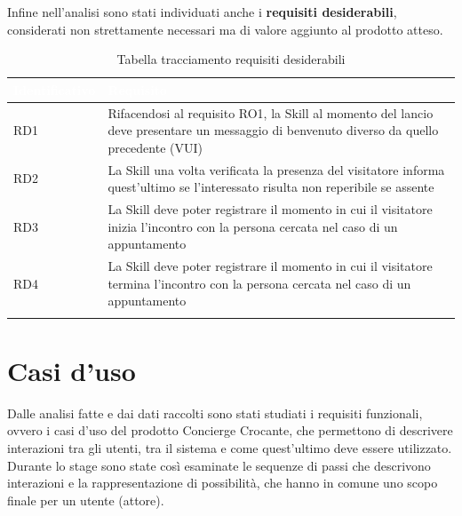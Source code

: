 \noindent Infine nell'analisi sono stati individuati anche i \textbf{requisiti desiderabili}, considerati non strettamente necessari ma di valore aggiunto al prodotto atteso.
\begin{center}
	\centering
	\renewcommand{\arraystretch}{1.5}
	\begin{longtable}{  p{2.5cm} p{9.8cm} }
		\rowcolor{tableHead}
		\textbf{\textcolor{white}{Identificativo}} & \textbf{\textcolor{white}{Requisito}} \\
		\endhead
		RD1 & Rifacendosi al requisito RO1, la Skill al momento del lancio deve presentare un messaggio di benvenuto diverso da quello precedente (VUI) \\
		RD2 & La Skill una volta verificata la presenza del visitatore informa quest'ultimo se l'interessato risulta non reperibile se assente \\
		RD3 & La Skill deve poter registrare il momento in cui il visitatore inizia l'incontro con la persona cercata nel caso di un appuntamento \\
		RD4 & La Skill deve poter registrare il momento in cui il visitatore termina l'incontro con la persona cercata nel caso di un appuntamento \\
		\rowcolor{white}
		\caption{Tabella tracciamento requisiti desiderabili}
	\end{longtable}
\end{center}

\newpage
\section{Casi d'uso}
Dalle analisi fatte e dai dati raccolti sono stati studiati i requisiti funzionali, ovvero i casi d'uso del prodotto Concierge Crocante, che permettono di descrivere interazioni tra gli utenti, tra il sistema e come quest'ultimo deve essere utilizzato. Durante lo stage sono state così esaminate le sequenze di passi che descrivono interazioni e la rappresentazione di possibilità, che hanno in comune uno scopo finale per un utente (attore).
